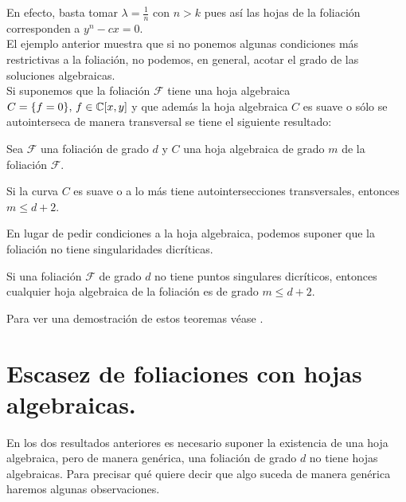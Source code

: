 En efecto, basta tomar $\lambda = \tfrac{1}{n}$ con $n>k$ pues así las hojas de la foliación corresponden a $y^n - cx = 0$.
\\

El ejemplo anterior muestra que si no ponemos algunas condiciones más restrictivas a la foliación, no podemos, en general, acotar el grado de las soluciones algebraicas.\\

Si suponemos que la foliación $\mathcal{F}$ tiene una hoja algebraica $C=\{ f=0\}, \, f\in\mathbb{C}[x,y]$ y que además la hoja algebraica $C$ es suave o sólo se autointerseca de manera transversal se tiene el siguiente resultado:\\

\begin{Teorema}
\label{Teo:CotaHojaSuave}
Sea $\mathcal{F}$ una foliación de grado $d$ y $C$ una hoja algebraica de grado $m$ de la foliación $\mathcal{F}$.

Si la curva $C$ es suave o a lo más tiene autointersecciones transversales, entonces $m\leq d+2$.
\end{Teorema}

En lugar de pedir condiciones a la hoja algebraica, podemos suponer que la foliación no tiene singularidades dicríticas.

\begin{Teorema}
\label{Teo:CotaSingularidadesNoDicriticas}
Si una foliación $\mathcal{F}$ de grado $d$ no tiene puntos singulares dicríticos, entonces cualquier hoja algebraica de la foliación es de grado $m\leq d+2$.
\end{Teorema}

Para ver una demostración de estos teoremas véase \cite[pp.~479,480]{IlyaYako}.

\section{Escasez de foliaciones con hojas algebraicas.}

En los dos resultados anteriores es necesario suponer la existencia de una hoja algebraica, pero de manera genérica, una foliación de grado $d$ no tiene hojas algebraicas. Para precisar qué quiere decir que algo suceda de manera genérica haremos algunas observaciones.\\

